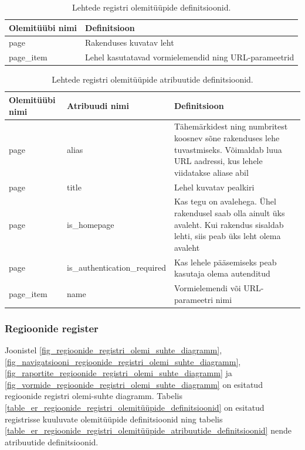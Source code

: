 \documentclass[a4paper,12pt]{article} %
\begin{document}
\begin{table}[H]
\centering
\caption{Lehtede registri olemitüüpide definitsioonid.}
\label{table_er_lehtede_registri_olemitüüpide_definitsioonid}
\begin{tabular}{|p{4cm}|p{11cm}|}
\hline
\rowcolor{rowgray}
Olemitüübi nimi & Definitsioon \\ \hline
page & Rakenduses kuvatav leht \\ \hline
page\_item & Lehel kasutatavad vormielemendid ning URL-parameetrid \\ \hline
\end{tabular}
\end{table}

\begin{table}[H]
\centering
\caption{Lehtede registri olemitüüpide atribuutide definitsioonid.}
\label{table_er_lehtede_registri_olemitüüpide_atribuutide_definitsioonid}
\begin{tabular}{|p{3cm}|p{3cm}|p{9cm}|}
\hline
\rowcolor{rowgray}
Olemitüübi nimi & Atribuudi nimi & Definitsioon \\ \hline
page & alias & Tähemärkidest ning numbritest koosnev sõne rakenduses lehe tuvastmiseks. Võimaldab luua URL aadressi, kus lehele viidatakse aliase abil \\ \hline
page & title & Lehel kuvatav pealkiri \\ \hline
page & is\_homepage & Kas tegu on avalehega. Ühel rakendusel saab olla ainult üks avaleht. Kui rakendus sisaldab lehti, siis peab üks leht olema avaleht \\ \hline
page & is\_authentication\newline\_required & Kas lehele pääsemiseks peab kasutaja olema autenditud \\ \hline
page\_item & name  & Vormielemendi või URL-parameetri nimi \\ \hline
\end{tabular}
\end{table}

\subsubsection{Regioonide register}
Joonistel \ref{fig_regioonide_registri_olemi_suhte_diagramm}, \ref{fig_navigatsiooni_regioonide_registri_olemi_suhte_diagramm}, \ref{fig_raportite_regioonide_registri_olemi_suhte_diagramm} ja \ref{fig_vormide_regioonide_registri_olemi_suhte_diagramm} on esitatud regioonide registri olemi-suhte diagramm. Tabelis \ref{table_er_regioonide_registri_olemitüüpide_definitsioonid} on esitatud registrisse kuuluvate olemitüüpide definitsioonid ning tabelis \ref{table_er_regioonide_registri_olemitüüpide_atribuutide_definitsioonid} nende atribuutide definitsioonid.
\end{document}
